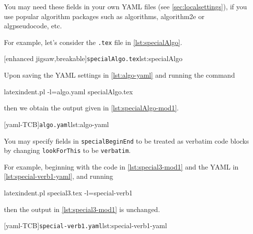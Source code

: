 \documentclass[10pt]{article}
\begin{document}
 You may need these fields in your own YAML files (see \vref{sec:localsettings}), if you
 use popular algorithm packages such as algorithms, algorithm2e or algpseudocode, etc.

 \begin{example}
 For example, let’s consider the \texttt{.tex} file in \cref{lst:specialAlgo}.
  

 [enhanced jigsaw,breakable]{\texttt{specialAlgo.tex}}{lst:specialAlgo}

 Upon saving the YAML settings in \cref{lst:algo-yaml} and running the command

 \begin{commandshell}
latexindent.pl -l=algo.yaml specialAlgo.tex
 \end{commandshell}

 then we obtain the output given in \cref{lst:specialAlgo-mod1}.

 \begin{cmhtcbraster}
  [yaml-TCB]{\texttt{algo.yaml}}{lst:algo-yaml}
 \end{cmhtcbraster}
 \end{example}

 You may  specify fields in
 \texttt{specialBeginEnd} to be treated as verbatim code blocks by changing
 \texttt{lookForThis} to be \texttt{verbatim}. %

 \begin{example}
 For example, beginning with the code in \cref{lst:special3-mod1} and the YAML in
 \cref{lst:special-verb1-yaml}, and running 

 \begin{commandshell}
latexindent.pl special3.tex -l=special-verb1
\end{commandshell}

 then the output in \cref{lst:special3-mod1} is unchanged.

 \begin{cmhtcbraster}
  [yaml-TCB]{\texttt{special-verb1.yaml}}{lst:special-verb1-yaml}
 \end{cmhtcbraster}
 \end{example}
\end{document}
